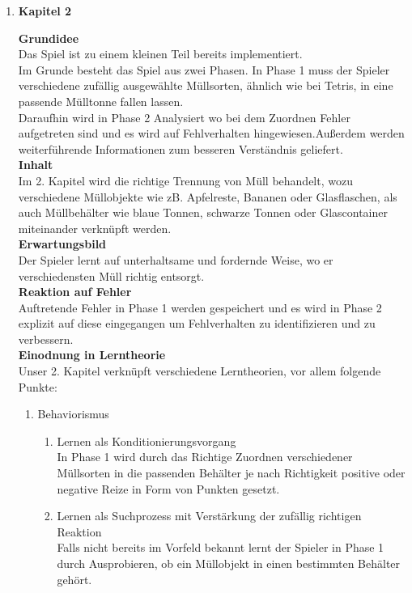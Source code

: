 \documentclass[a4paper]{article}
\newcommand{\TOP}[1]{\item \textbf{#1}\par}
\begin{document}
\begin{enumerate}
\TOP{Kapitel 2}
\textbf{Grundidee}\\
Das Spiel ist zu einem kleinen Teil bereits implementiert.\\
Im Grunde besteht das Spiel aus zwei Phasen. In Phase 1 muss der Spieler verschiedene zufällig ausgewählte Müllsorten, ähnlich wie bei Tetris, in eine passende Mülltonne fallen lassen.\\
Daraufhin wird in Phase 2 Analysiert wo bei dem Zuordnen Fehler aufgetreten sind und es wird auf Fehlverhalten hingewiesen.Außerdem werden weiterführende Informationen zum besseren Verständnis geliefert.\\
\textbf{Inhalt}\\
Im 2. Kapitel wird die richtige Trennung von Müll behandelt, wozu verschiedene Müllobjekte wie zB. Apfelreste, Bananen oder Glasflaschen, als auch Müllbehälter wie blaue Tonnen, schwarze Tonnen oder Glascontainer miteinander verknüpft werden.\\
\textbf{Erwartungsbild}\\
Der Spieler lernt auf unterhaltsame und fordernde Weise, wo er verschiedensten Müll richtig entsorgt.\\
\textbf{Reaktion auf Fehler}\\
Auftretende Fehler in Phase 1 werden gespeichert und es wird in Phase 2 explizit auf diese eingegangen um Fehlverhalten zu identifizieren und zu verbessern.\\
\textbf{Einodnung in Lerntheorie}\\
Unser 2. Kapitel verknüpft verschiedene Lerntheorien, vor allem folgende Punkte:\\
\begin{enumerate}


\item Behaviorismus
  \begin{enumerate}
    \item Lernen als Konditionierungsvorgang\\
    In Phase 1 wird durch das Richtige Zuordnen verschiedener Müllsorten in die passenden Behälter je nach Richtigkeit positive oder negative Reize in Form von Punkten gesetzt.
    \item Lernen als Suchprozess mit Verstärkung der zufällig richtigen Reaktion\\
     Falls nicht bereits im Vorfeld bekannt lernt der Spieler in Phase 1 durch Ausprobieren, ob ein Müllobjekt in einen bestimmten Behälter gehört.
  \end{enumerate}


\end{enumerate}
\end{enumerate}
\end{document}
